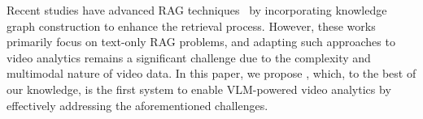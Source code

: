 Recent studies have advanced RAG techniques~\cite{edge2024graphrag, lazygraphrag2024, guo2024lightrag, fan2025minirag} by incorporating knowledge graph construction to enhance the retrieval process. However, these works primarily focus on text-only RAG problems, and adapting such approaches to video analytics remains a significant challenge due to the complexity and multimodal nature of video data. In this paper, we propose \sysname, which, to the best of our knowledge, is the first system to enable VLM-powered video analytics by effectively addressing the aforementioned challenges.








